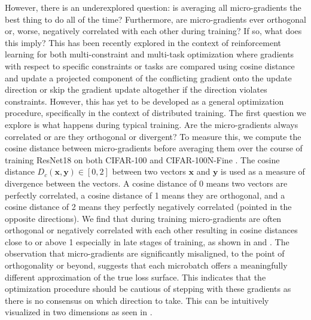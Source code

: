 However, there is an underexplored question: is averaging all micro-gradients the best thing to do all of the time? Furthermore, are micro-gradients ever orthogonal or, worse, negatively correlated with each other during training? If so, what does this imply? This has been recently explored in the context of reinforcement learning for both multi-constraint  \cite{yao2023gradientshapingmulticonstraintsafe} and multi-task optimization \cite{yu2020gradientsurgerymultitasklearning} where gradients with respect to specific constraints or tasks are compared using cosine distance and update a projected component of the conflicting gradient onto the update direction or skip the gradient update altogether if the direction violates constraints. However, this has yet to be developed as a general optimization procedure, specifically in the context of distributed training. The first question we explore is what happens during typical training. Are the micro-gradients always correlated or are they orthogonal or divergent? To measure this, we compute the cosine distance between micro-gradients before averaging them over the course of training ResNet18 \cite{he2016deep} on both CIFAR-100 \cite{krizhevsky2009learning} and CIFAR-100N-Fine \cite{wei2022learning}. The cosine distance $D_c(\mathbf{x},\mathbf{y}) \in [0, 2]$ between two vectors $\mathbf{x}$ and $\mathbf{y}$ is used as a measure of divergence between the vectors. A cosine distance of 0 means two vectors are perfectly correlated, a cosine distance of 1 means they are orthogonal, and a cosine distance of 2 means they perfectly negatively correlated (pointed in the opposite directions). We find that during training micro-gradients are often orthogonal or negatively correlated with each other resulting in cosine distances close to or above 1 especially in late stages of training, as shown in  and . The observation that micro-gradients are significantly misaligned, to the point of orthogonality or beyond, suggests that each microbatch offers a meaningfully different approximation of the true loss surface. This indicates that the optimization procedure should be cautious of stepping with these gradients as there is no consensus on which direction to take. This can be intuitively visualized in two dimensions as seen in .

